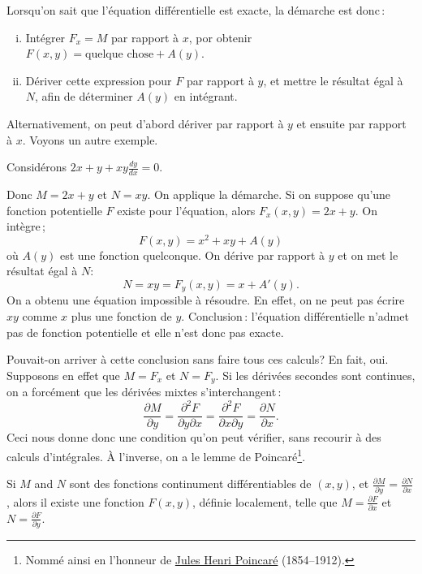 Lorsqu'on sait que l'équation différentielle est exacte, la démarche est donc\,: 
\begin{enumerate}[(i)]
\item Intégrer $F_x = M$ par rapport à $x$, por obtenir $F(x,y) = \text{quelque chose} + A(y)$.
\item Dériver cette expression pour $F$ par rapport à $y$, et mettre le résultat égal à 
$N$, afin de déterminer $A(y)$ en intégrant.
\end{enumerate}
Alternativement, on peut d'abord dériver par rapport à $y$ et ensuite par rapport à $x$.
Voyons un autre exemple. 

\begin{example}
Considérons $2x+y + xy \frac{dy}{dx} = 0$.

Donc $M = 2x+y$ et $N=xy$.  On applique la démarche.  Si on suppose qu'une fonction potentielle $F$ existe pour l'équation, alors $F_x (x,y) = 2x+y$.
On intègre\,; 
\begin{equation*}
F(x,y) = x^2 + xy + A(y)
\end{equation*}
où $A(y)$ est une fonction quelconque. On dérive par rapport à $y$ et on met le résultat égal à $N$:
\begin{equation*}
N = xy = F_y (x,y) = x+A'(y) .
\end{equation*}
On a obtenu une équation impossible à résoudre.  En effet, on ne peut pas écrire $xy$ comme 
$x$ plus une fonction de $y$.  Conclusion\,: l'équation différentielle n'admet pas de fonction potentielle et elle n'est donc pas exacte.
\end{example}

Pouvait-on arriver à cette conclusion sans faire tous ces calculs?  En fait, oui.  Supposons en effet que 
$M = F_x$ et
$N = F_y$.  Si les dérivées secondes sont continues, on a forcément que les dérivées mixtes s'interchangent\,: 
\begin{equation*}
\frac{\partial M}{\partial y}
=
\frac{\partial^2 F}{\partial y \partial x}
=
\frac{\partial^2 F}{\partial x \partial y}
=
\frac{\partial N}{\partial x} .
\end{equation*}
Ceci nous donne donc une condition qu'on peut vérifier, sans recourir à des calculs d'intégrales.  À l'inverse, on a le lemme de Poincaré\footnote{Nommé ainsi en l'honneur de 
\href{https://en.wikipedia.org/wiki/Henri_Poincar\%C3\%A9}{Jules Henri
Poincaré} (1854--1912).}.

\begin{theorem}[Poincaré]
Si $M$ and $N$ sont des fonctions continument différentiables de $(x,y)$, et 
$\frac{\partial M}{\partial y} = \frac{\partial N}{\partial x}$,
alors il existe une fonction $F(x,y)$, définie localement, telle que $M = \frac{\partial F}{\partial x}$ et 
$N = \frac{\partial F}{\partial y}$.
\end{theorem}

